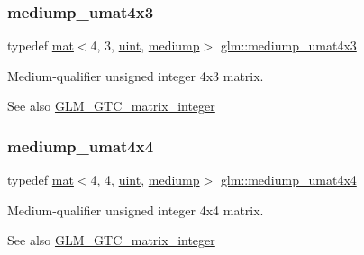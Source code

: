 \subsubsection{\texorpdfstring{mediump\+\_\+umat4x3}{mediump\_umat4x3}}
{\footnotesize\ttfamily typedef \mbox{\hyperlink{structglm_1_1mat}{mat}}$<$4, 3, \mbox{\hyperlink{group__core__precision_ga4fd29415871152bfb5abd588334147c8}{uint}}, \mbox{\hyperlink{namespaceglm_a36ed105b07c7746804d7fdc7cc90ff25a6416f3ea0c9025fb21ed50c4d6620482}{mediump}}$>$ \mbox{\hyperlink{group__gtc__matrix__integer_ga974bc32af0686378c4696208c3103d96}{glm\+::mediump\+\_\+umat4x3}}}

Medium-\/qualifier unsigned integer 4x3 matrix. \begin{DoxySeeAlso}{See also}
\mbox{\hyperlink{group__gtc__matrix__integer}{G\+L\+M\+\_\+\+G\+T\+C\+\_\+matrix\+\_\+integer}} 
\end{DoxySeeAlso}
\mbox{\label{group__gtc__matrix__integer_ga0dcca70aa643639489cf52acf7574e6c}} 
\subsubsection{\texorpdfstring{mediump\+\_\+umat4x4}{mediump\_umat4x4}}
{\footnotesize\ttfamily typedef \mbox{\hyperlink{structglm_1_1mat}{mat}}$<$4, 4, \mbox{\hyperlink{group__core__precision_ga4fd29415871152bfb5abd588334147c8}{uint}}, \mbox{\hyperlink{namespaceglm_a36ed105b07c7746804d7fdc7cc90ff25a6416f3ea0c9025fb21ed50c4d6620482}{mediump}}$>$ \mbox{\hyperlink{group__gtc__matrix__integer_ga0dcca70aa643639489cf52acf7574e6c}{glm\+::mediump\+\_\+umat4x4}}}

Medium-\/qualifier unsigned integer 4x4 matrix. \begin{DoxySeeAlso}{See also}
\mbox{\hyperlink{group__gtc__matrix__integer}{G\+L\+M\+\_\+\+G\+T\+C\+\_\+matrix\+\_\+integer}} 
\end{DoxySeeAlso}
\mbox{\label{group__gtc__matrix__integer_gae2d45c058cfa0b60ab4df0cdda2d8516}} 
